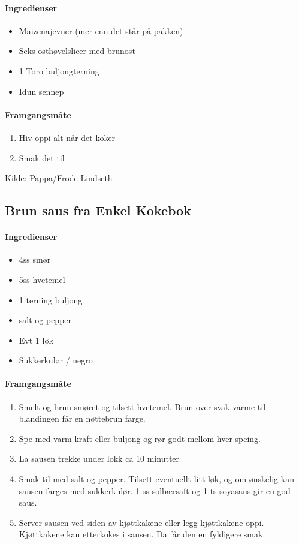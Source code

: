 \documentclass[12pt,a4paper]{book}
\begin{document}
\paragraph{Ingredienser}
\begin{itemize}[noitemsep]
	\item Maizenajevner (mer enn det står på pakken)
	\item Seks osthøvelslicer med brunost
	\item 1 Toro buljongterning
	\item Idun sennep
\end{itemize}


\paragraph{Framgangsmåte}
\begin{enumerate}[noitemsep]
	\item Hiv oppi alt når det koker
	\item Smak det til
\end{enumerate}

Kilde: Pappa/Frode Lindseth


\subsection{Brun saus fra Enkel Kokebok}
\paragraph{Ingredienser}
\begin{itemize}[noitemsep]
	\item 4ss smør
	\item 5ss hvetemel
	\item 1 terning buljong
	\item salt og pepper
	\item Evt 1 løk
	\item Sukkerkulør / negro
\end{itemize}


\paragraph{Framgangsmåte}
\begin{enumerate}[noitemsep]
	\item Smelt og brun smøret og tilsett hvetemel. Brun over svak varme til blandingen får en nøttebrun farge.
	\item Spe med varm kraft eller buljong og rør godt mellom hver speing.
	\item La sausen trekke under lokk ca 10 minutter
	\item Smak til med salt og pepper. Tilsett eventuellt litt løk, og om ønskelig kan sausen farges med sukkerkulør. 1 ss solbærsaft og 1 ts soyasaus gir en god saus.
	\item Server sausen ved siden av kjøttkakene eller legg kjøttkakene oppi. Kjøttkakene kan etterkokes i sausen. Da får den en fyldigere smak.
\end{enumerate}
\end{document}
